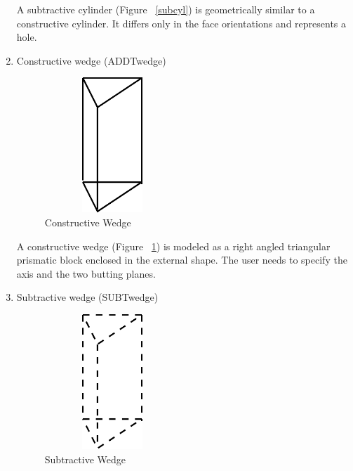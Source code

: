 \begin{enumerate}
        A subtractive cylinder (Figure ~\ref{subcyl}) is geometrically
        similar to a constructive cylinder. It differs
        only in the face orientations and represents a hole.

    \item
    Constructive wedge (ADDTwedge)

        \begin{figure}[htbp]
                      \hspace{4cm}
          \includegraphics[width=2.0in,height=2.0in]{ADDWED.pdf}
            \caption{Constructive Wedge}
            \label{addwed}
        \end{figure}

        A constructive wedge (Figure ~\ref{addwed}) is modeled as
        a right angled triangular prismatic block enclosed in the external
        shape. The user needs to specify the axis and the two butting
        planes.

    \item
    Subtractive wedge (SUBTwedge)

        \begin{figure}[htbp]
                     \hspace{4cm}
         \includegraphics[width=2.0in,height=2.0in]{SUBWED.pdf}
            \caption{Subtractive Wedge}
            \label{subwed}
        \end{figure}


\end{enumerate}
